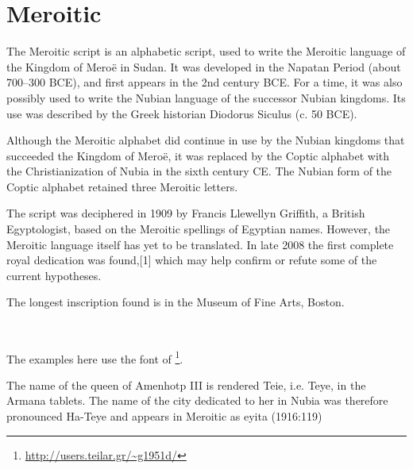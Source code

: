 \section{Meroitic}
\label{s:meroitic}

The Meroitic script is an alphabetic script, used to write the Meroitic language of the Kingdom of Meroë in Sudan. It was developed in the Napatan Period (about 700–300 BCE), and first appears in the 2nd century BCE. For a time, it was also possibly used to write the Nubian language of the successor Nubian kingdoms. Its use was described by the Greek historian Diodorus Siculus (c. 50 BCE).

Although the Meroitic alphabet did continue in use by the Nubian kingdoms that succeeded the Kingdom of Meroë, it was replaced by the Coptic alphabet with the Christianization of Nubia in the sixth century CE. The Nubian form of the Coptic alphabet retained three Meroitic letters.

The script was deciphered in 1909 by Francis Llewellyn Griffith, a British Egyptologist, based on the Meroitic spellings of Egyptian names. However, the Meroitic language itself has yet to be translated. In late 2008 the first complete royal dedication was found,[1] which may help confirm or refute some of the current hypotheses.

The longest inscription found is in the Museum of Fine Arts, Boston.

\newfontfamily{}^^A

%


The examples here use the  font of \footnote{\url{http://users.teilar.gr/~g1951d/}}.

The name of the queen of Amenhotp III is rendered Teie, i.e. Teye, in the Armana 
tablets. The name of the city dedicated to her in Nubia was therefore pronounced 
Ha-Teye and appears in Meroitic as eyita (1916:119)









